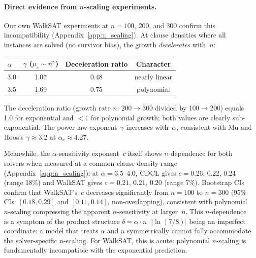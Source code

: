 \documentclass[11pt,a4paper]{article}
\newcommand{\mc}{\mu_c}
\begin{document}
\paragraph{Direct evidence from $n$-scaling experiments.}
Our own WalkSAT experiments at $n = 100$, $200$, and $300$
confirm this incompatibility (Appendix~\ref{app:n_scaling}).
At clause densities where all instances are solved
(no survivor bias), the growth \emph{decelerates} with~$n$:
\begin{center}
\begin{tabular}{lccc}
\toprule
$\alpha$ & $\gamma$ ($\mc \sim n^\gamma$) &
  Deceleration ratio & Character \\
\midrule
3.0 & 1.07 & 0.48 & nearly linear \\
3.5 & 1.69 & 0.75 & polynomial \\
\bottomrule
\end{tabular}
\end{center}
The deceleration ratio (growth rate $n$: 200$\to$300
divided by 100$\to$200) equals 1.0 for exponential
and $< 1$ for polynomial growth; both values are clearly
sub-exponential.
The power-law exponent~$\gamma$ increases with~$\alpha$,
consistent with Mu and Hoos's $\gamma \approx 3.2$ at
$\alpha_c \approx 4.27$.

Meanwhile, the $\alpha$-sensitivity exponent~$c$ itself
shows $n$-dependence for both solvers when measured at
a common clause density range
(Appendix~\ref{app:n_scaling}):
at $\alpha = 3.5$--$4.0$, CDCL gives
$c = 0.26$, $0.22$, $0.24$ (range 18\%)
and WalkSAT gives $c = 0.21$, $0.21$, $0.20$ (range 7\%).
Bootstrap CIs confirm that WalkSAT's~$c$ decreases
significantly from $n = 100$ to $n = 300$
(95\% CIs: $[0.18, 0.29]$ and $[0.11, 0.14]$, non-overlapping),
consistent with polynomial $n$-scaling compressing the
apparent $\alpha$-sensitivity at larger~$n$.
This $n$-dependence is a symptom of the
product structure $\delta = \alpha \cdot n \cdot |\!\ln(7/8)|$
being an imperfect coordinate:
a model that treats $\alpha$ and $n$ symmetrically
cannot fully accommodate the solver-specific $n$-scaling.
For WalkSAT, this is acute: polynomial $n$-scaling
is fundamentally incompatible with the exponential prediction.
\end{document}
